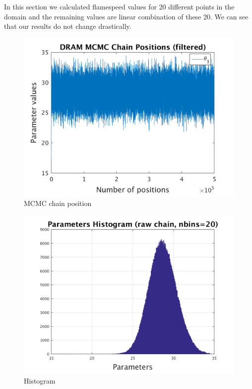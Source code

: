 In this section we calculated flamespeed values for 20 different points in the domain and the remaining values are linear combination of these 20. We can see that our results do not change drastically. 

\begin{figure}[H]
  
  \centering
   \includegraphics[scale=0.75]{53_results/output_20/simple_ip_chain_pos_filt}
   \caption{MCMC chain position }
\end{figure}


\begin{figure}[H]
  
  \centering
   \includegraphics[scale=0.75]{53_results/output_20/simple_ip_hist_raw}
   \caption{Histogram}
\end{figure}



